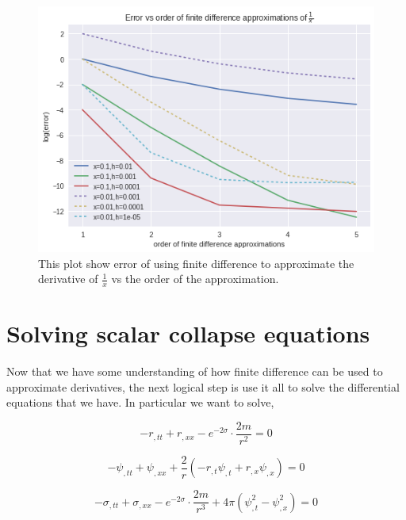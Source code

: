 \begin{figure}[hbt!]
    \centering
    \includegraphics[width=\textwidth]{images/1_x_error_vs_order.png}
    \caption{This plot show error of using finite difference to approximate the derivative of $\frac{1}{x}$ vs the order of the approximation.}
    \label{fig:1/x_error_vs_order}
\end{figure}


\section{Solving scalar collapse equations}

Now that we have some understanding of how finite difference can be used to approximate derivatives, the next logical step is use it all to solve the differential equations that we have. In particular we want to solve,

\begin{equation}
    -r_{, t t}+r_{, x x}-e^{-2 \sigma} \cdot \frac{2 m}{r^{2}}=0
    \label{eqn:r_chap3}
\end{equation}

\begin{equation}
    -\psi_{, t t}+\psi_{, x x}+\frac{2}{r}\left(-r_{, t} \psi_{, t}+r_{, x} \psi_{, x}\right)=0
    \label{eqn:psi_chap3}
\end{equation}

\begin{equation}
    -\sigma_{, t t}+\sigma_{, x x}-e^{-2 \sigma} \cdot \frac{2 m}{r^{3}}+4 \pi\left(\psi_{, t}^{2}-\psi_{, x}^{2}\right)=0
    \label{eqn:sigma_chap3}
\end{equation}

